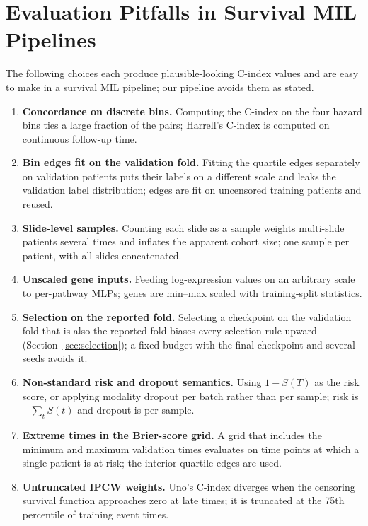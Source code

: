 \documentclass{article}
\newcommand{\cindex}{C-index}
\begin{document}
\section{Evaluation Pitfalls in Survival MIL Pipelines}
\label{app:pitfalls}
The following choices each produce plausible-looking \cindex{} values and are easy to make in a survival MIL pipeline; our pipeline avoids them as stated.
\begin{enumerate}
\item \textbf{Concordance on discrete bins.} Computing the \cindex{} on the four hazard bins ties a large fraction of the pairs; Harrell's \cindex{} is computed on continuous follow-up time.
\item \textbf{Bin edges fit on the validation fold.} Fitting the quartile edges separately on validation patients puts their labels on a different scale and leaks the validation label distribution; edges are fit on uncensored training patients and reused.
\item \textbf{Slide-level samples.} Counting each slide as a sample weights multi-slide patients several times and inflates the apparent cohort size; one sample per patient, with all slides concatenated.
\item \textbf{Unscaled gene inputs.} Feeding log-expression values on an arbitrary scale to per-pathway MLPs; genes are min--max scaled with training-split statistics.
\item \textbf{Selection on the reported fold.} Selecting a checkpoint on the validation fold that is also the reported fold biases every selection rule upward (Section~\ref{sec:selection}); a fixed budget with the final checkpoint and several seeds avoids it.
\item \textbf{Non-standard risk and dropout semantics.} Using $1 - S(T)$ as the risk score, or applying modality dropout per batch rather than per sample; risk is $-\sum_t S(t)$ and dropout is per sample.
\item \textbf{Extreme times in the Brier-score grid.} A grid that includes the minimum and maximum validation times evaluates on time points at which a single patient is at risk; the interior quartile edges are used.
\item \textbf{Untruncated IPCW weights.} Uno's \cindex{} diverges when the censoring survival function approaches zero at late times; it is truncated at the 75th percentile of training event times.
\end{enumerate}

\FloatBarrier
\end{document}
